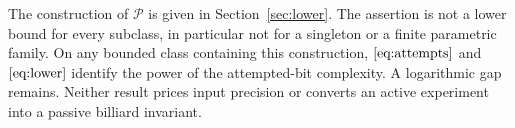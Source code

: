 The construction of $\mathcal P$ is given in Section~\ref{sec:lower}.
The assertion is not a lower bound for every subclass, in particular
not for a singleton or a finite parametric family. On any bounded class containing this construction, $\eqref{eq:attempts}$ and
$\eqref{eq:lower}$ identify the power of the attempted-bit complexity.
A logarithmic gap remains. Neither result prices input precision or
converts an active experiment into a passive billiard invariant.
